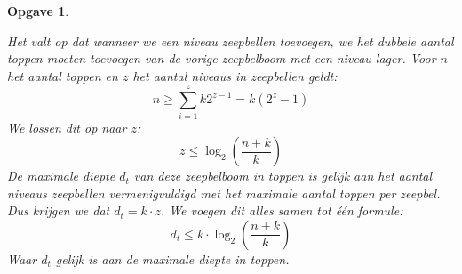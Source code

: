 \documentclass[12pt,hidelinks]{article}
\newtheorem{opgave}{Opgave}
\begin{document}
\begin{opgave}
\begin{enumerate}[a.]
            Het valt op dat wanneer we een niveau zeepbellen toevoegen, we het dubbele aantal toppen moeten toevoegen van de vorige zeepbelboom met een niveau lager. 
            Voor $n$ het aantal toppen en $z$ het aantal niveaus in zeepbellen geldt: 
            $$n \ge \sum\limits_{i=1}^z k2^{z-1} = k(2^z-1)$$
            We lossen dit op naar $z$: $$z \le \log_2{\left(\dfrac{n+k}{k}\right)}$$
            De maximale diepte $d_t$ van deze zeepbelboom in toppen is gelijk aan het aantal niveaus zeepbellen vermenigvuldigd met het maximale aantal toppen per zeepbel.
            Dus krijgen we dat $d_t=k\cdot z$.
            We voegen dit alles samen tot één formule:
            \begin{equation}
                d_t \le k \cdot \log_2{\left(\dfrac{n+k}{k}\right)}
                \label{topdiepte}
            \end{equation}
            Waar $d_t$ gelijk is aan de maximale diepte in toppen.
        \endgroup 
\end{enumerate}
    \end{opgave}	
\end{document}
